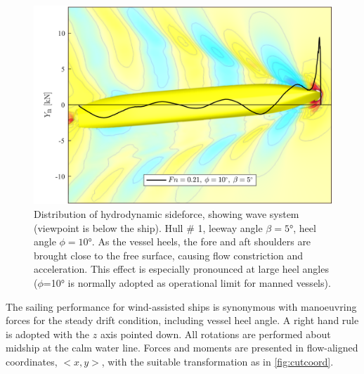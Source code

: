 \documentclass[twoside,twocolumn]{article}
\begin{document}
	\begin{figure}[!h]
		\centering
		\includegraphics[width=.7\textwidth]{images/hull1.png}  %
		\caption{Distribution of hydrodynamic sideforce, showing wave system (viewpoint is below the ship).  Hull \# 1, leeway angle $\beta=\ang{5}$, heel angle $\phi=\ang{10}$. As the vessel heels, the fore and aft shoulders are brought close to the free surface, causing flow constriction and acceleration. This effect is especially pronounced at large heel angles ($\phi$=\ang{10} is normally adopted as operational limit for manned vessels).}
		\label{fig:Ynphi}
	\end{figure}
	
	
	The sailing performance for wind-assisted ships is synonymous with manoeuvring forces for the steady drift condition, including vessel heel angle. A right hand rule is adopted with the $z$ axis pointed down. All rotations are performed about midship at the calm water line. Forces and moments are presented in flow-aligned coordinates, $<x,y>$, with the suitable transformation as in \cref{fig:cutcoord}.
	
\end{document}

